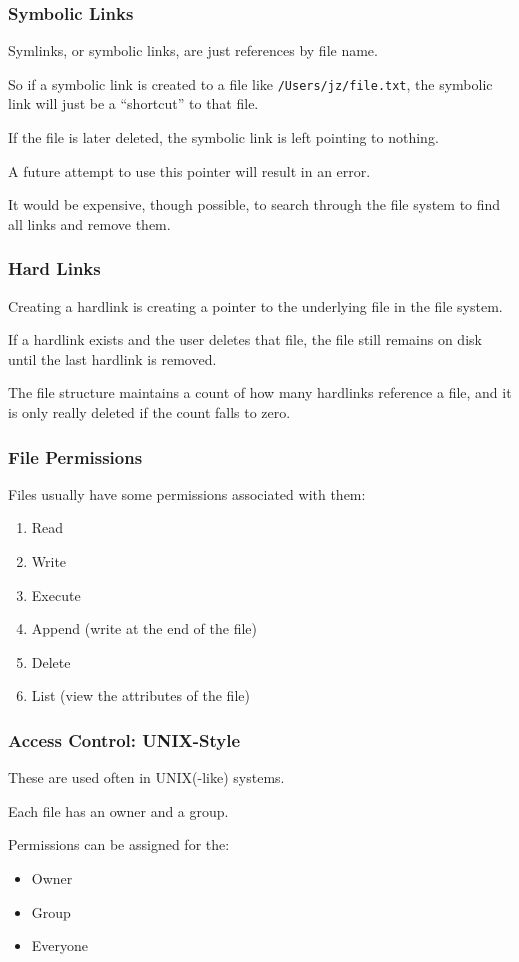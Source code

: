 \begin{frame}
	\frametitle{Symbolic Links}

	Symlinks, or symbolic links, are just references by file name.

	So if a symbolic link is created to a file like \texttt{/Users/jz/file.txt}, the symbolic link will just be a ``shortcut'' to that file.

	If the file is later deleted, the symbolic link is left pointing to nothing.

	A future attempt to use this pointer will result in an error.

	It would be expensive, though possible, to search through the file system to find all links and remove them.


\end{frame}

\begin{frame}
	\frametitle{Hard Links}

	Creating a hardlink is creating a pointer to the underlying file in the file system.

	If a hardlink exists and the user deletes that file, the file still remains on disk until the last hardlink is removed.

	The file structure maintains a count of how many hardlinks reference a file, and it is only really deleted if the count falls to zero.


\end{frame}



\begin{frame}
	\frametitle{File Permissions}

	Files usually have some permissions associated with them:

	\begin{enumerate}
		\item Read
		\item Write
		\item Execute
		\item Append (write at the end of the file)
		\item Delete
		\item List (view the attributes of the file)
	\end{enumerate}

\end{frame}

\begin{frame}
	\frametitle{Access Control: UNIX-Style}

	These are used often in UNIX(-like) systems.

	Each file has an owner and a group.

	Permissions can be assigned for the:
	\begin{itemize}
		\item Owner
		\item Group
		\item Everyone
	\end{itemize}


\end{frame}

